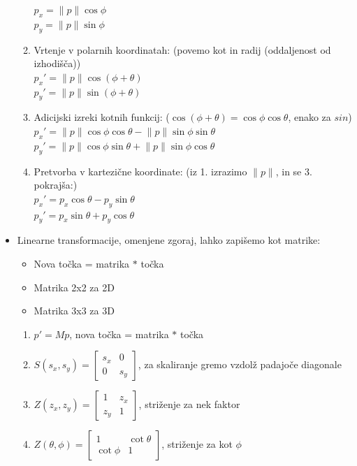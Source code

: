 \documentclass{article}
\begin{document}
\begin{itemize}
\begin{enumerate}
        $p_x = \lVert p \rVert \cos{\phi}$ \\
        $p_y = \lVert p \rVert \sin{\phi}$
        \item Vrtenje v polarnih koordinatah: (povemo kot in radij (oddaljenost od izhodišča)) \\
        $p_x' = \lVert p \rVert \cos{(\phi + \theta)}$ \\
        $p_y' = \lVert p \rVert \sin{(\phi + \theta)}$
        \item Adicijski izreki kotnih funkcij: ($\cos{(\phi + \theta)} = \cos{\phi}\cos{\theta}$, enako za $sin$) \\
        $p_x' = \lVert p \rVert \cos{\phi} \cos{\theta} - \lVert p \rVert \sin{\phi} \sin{\theta}$ \\
        $p_y' = \lVert p \rVert \cos{\phi} \sin{\theta} + \lVert p \rVert \sin{\phi} \cos{\theta}$
        \item Pretvorba v kartezične koordinate: (iz 1. izrazimo $\lVert p \rVert$, in se 3. pokrajša:)\\
        $p_x' = p_x \cos{\theta} - p_y \sin{\theta}$ \\
        $p_y' = p_x \sin{\theta} + p_y \cos{\theta}$
    \end{enumerate}
    \item Linearne transformacije, omenjene zgoraj, lahko zapišemo kot matrike:
    \begin{itemize}
        \item Nova točka = matrika $*$ točka
        \item Matrika 2x2 za 2D
        \item Matrika 3x3 za 3D
    \end{itemize}
    \begin{enumerate}
        \item $p' = Mp$, nova točka = matrika $*$ točka
        \item $S(s_x, s_y) = \begin{bmatrix} s_x & 0 \\ 0 & s_y \end{bmatrix}$, za skaliranje gremo vzdolž padajoče diagonale
        \item $Z(z_x, z_y) = \begin{bmatrix} 1 & z_x \\ z_y & 1 \end{bmatrix}$, striženje za nek faktor
        \item $Z(\theta, \phi) = \begin{bmatrix} 1 & \cot{\theta} \\ \cot{\phi} & 1 \end{bmatrix}$, striženje za kot $\phi$  

\end{enumerate}
\end{itemize}
\end{document}
